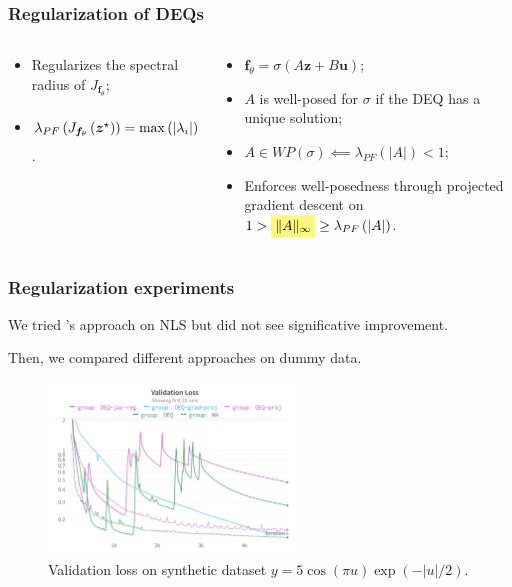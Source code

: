 \documentclass[t]{beamer}
\newcommand{\highlight}[1]{%
  \colorbox{yellow!50}{$\displaystyle#1$}}
\begin{document}
\begin{frame}
    \frametitle{Regularization of DEQs}

    \begin{columns}
	\begin{column}{0.5\textwidth}
	    \cite{bai_stabilizing_2021}
	    \begin{itemize}[label={\textbullet}]
		\item Regularizes the spectral radius of $J_{\bm{f}_{\theta}}$;
		\item $\lambda_{PF}\left( J_{\bm{f}_{\theta}}\left( \bm{z}^{\star} \right)  \right) = \max\left( |\lambda_i| \right) \le \sqrt{tr\left( J_{\bm{f}_{\theta}}J_{\bm{f}_{\theta}}^T \right) } = \highlight{\|J_{\bm{f}_{\theta}}\|_{F}} $.
	    \end{itemize}
	\end{column}
	\pause
        \begin{column}{0.5\textwidth}
	    \cite{Ghaoui2019}
	    \begin{itemize}[label={\textbullet}]
		\item $\bm{f}_{\theta} = \sigma\left( A\bm{z} + B\bm{u} \right)$;
	        \item $A$ is well-posed for $\sigma$ if the DEQ has a unique solution;
		\item $A\in WP\left( \sigma \right) \impliedby \lambda_{PF}\left( |A| \right) < 1  $;
		\item Enforces well-posedness through projected gradient descent on $1 > \highlight{\|A\|_{\infty}} \ge \lambda_{PF}\left( |A| \right)$.
	    \end{itemize}
        \end{column}
    \end{columns}
\end{frame}

\begin{frame}
    \frametitle{Regularization experiments}
    We tried \cite{Ghaoui2019}'s approach on NLS but did not see significative improvement.\pause

    Then, we compared different approaches on dummy data.

    \begin{figure}[h]
        \centering
        \includegraphics[width=0.6\textwidth]{dummy-val.png}
        \caption{Validation loss on synthetic dataset $y=5\cos\left( \pi u \right)\exp(-|u|/2)$.}
        \label{fig:dummy-val-png}
    \end{figure}
\end{frame}
\end{document}
